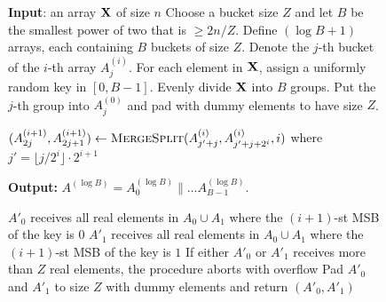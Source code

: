 
\begin{figure*}[h!]
\centering

\begin{algorithm}
\begin{algorithmic}
\State
\State \textbf{Input}: an array $\mathbf{X}$ of size $n$
\State Choose a bucket size $Z$ and let $B$ be the smallest power of two that is $\geq 2n/Z$. 
\State Define $(\log B+1)$ arrays, each containing $B$ buckets of size $Z$. Denote the $j$-th bucket of the $i$-th array $A_j^{(i)}$.
\State For each element in $\mathbf{X}$, assign a uniformly random key in $[0,B-1]$.
\State Evenly divide $\mathbf{X}$ into $B$ groups. Put the $j$-th group into $A_j^{(0)}$ and pad with dummy elements to have size $Z$.

        \State $(A^{(i+1)}_{2j}, A^{(i+1)}_{2j+1}) \leftarrow \textsc{MergeSplit}(A^{(i)}_{j'+j}, A^{(i)}_{j'+j+2^i}, i)$ where $j'=\lfloor j / {2^i} \rfloor \cdot 2^{i+1}$
        \State {}
        
    \EndFor
\EndFor    
\State \textbf{Output:} $A^{(\log B)} = A_0^{(\log B)} \| \ldots A_{B-1}^{(\log B)}$.

\medskip
{}
    \State $A'_0$ receives all real elements in $A_0 \cup A_1$ where the $(i+1)$-st MSB of the key is $0$   
    \State $A'_1$ receives all real elements in $A_0 \cup A_1$ where the $(i+1)$-st MSB of the key is $1$
    \State If either $A'_0$ or $A'_1$ receives more than $Z$ real elements, the procedure aborts with {\sf overflow}
    \State Pad $A'_0$ and $A'_1$ to size $Z$ with dummy elements and return $(A'_0, A'_1)$
\EndFunction   
\end{algorithmic}
\label{code:obin}
\end{algorithm}

\end{figure*}
